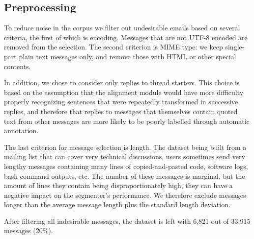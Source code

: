 \subsection{Preprocessing}

To reduce noise in the corpus we filter out undesirable emails based on several criteria, the first of which is encoding. Messages that are not UTF-8 encoded are removed from the selection. The second criterion is MIME type: we keep single-part plain text messages only, and remove those with HTML or other special contents.

In addition, we chose to consider only replies to thread starters. This choice is based on the assumption that the alignment module would have more difficulty properly recognizing sentences that were repeatedly transformed in successive replies, and therefore that replies to messages that themselves contain quoted text from other messages are more likely to be poorly labelled through automatic annotation.

The last criterion for message selection is length. The dataset being built from a mailing list that can cover very technical discussions, users sometimes send very lengthy messages containing many lines of copied-and-pasted code, software logs, bash command outputs, etc. The number of these messages is marginal, but the amount of lines they contain being disproportionately high, they can have a negative impact on the segmenter's performance. We therefore exclude messages longer than the average message length plus the standard length deviation.

After filtering all indesirable messages, the dataset is left with 6,821 out of 33,915 messages (20\%).
